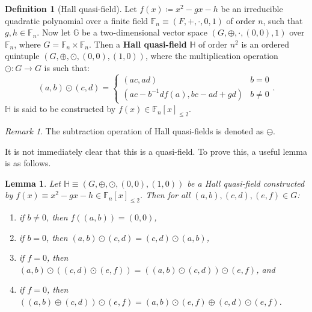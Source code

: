 \documentclass{report}
\newcommand{\F}{\mathbb{F}}
\renewcommand{\H}{\mathbb{H}}
\newcommand{\G}{\mathbb{G}}
\newtheorem{lemma}[theorem]{Lemma}
\theoremstyle{definition}\newtheorem*{definition}{Definition}
\theoremstyle{definition}\newtheorem*{example}{Example}
\theoremstyle{remark}\newtheorem*{remark}{Remark}
\begin{document}
\begin{definition}[Hall quasi-field]
Let $ f(x) \coloneqq x^2 - gx - h $ be an irreducible quadratic polynomial over a finite field $ \F_n \equiv (F, +, \cdot, 0, 1) $ of order $ n $, such that $ g, h \in \F_n $. Now let $ \G $ be a two-dimensional vector space $ (G, \oplus, \cdot, (0, 0), 1) $ over $ \F_n $, where $ G = \F_n \times \F_n $. Then a \textbf{Hall quasi-field} $ \H $ of order $ n^2 $ is an ordered quintuple $ (G, \oplus, \odot, (0, 0), (1, 0)) $, where the multiplication operation $ \odot : G \to G $ is such that: $$ (a, b) \odot (c, d) = \begin{cases} (ac, ad) & b = 0 \\ (ac - b^{-1} d f(a), bc - ad + gd) & b \ne 0 \end{cases}. $$ $ \H $ is said to be constructed by $ f(x) \in \F_n[x]_{\le 2} $.
\end{definition}

\begin{remark}
The subtraction operation of Hall quasi-fields is denoted as $ \ominus $.
\end{remark}

It is not immediately clear that this is a quasi-field. To prove this, a useful lemma is as follows.

\begin{lemma}
\label{lemma:hallquasi}
Let $ \H \equiv (G, \oplus, \odot, (0, 0), (1, 0)) $ be a Hall quasi-field constructed by $ f(x) \equiv x^2 - gx - h \in \F_n[x]_{\le 2} $. Then for all $ (a, b), (c, d), (e, f) \in G $:
\begin{enumerate}
  \item if $ b \ne 0 $, then $ f((a, b)) = (0, 0) $,
  \item if $ b = 0 $, then $ (a, b) \odot (c, d) = (c, d) \odot (a, b) $,
  \item if $ f = 0 $, then $ (a, b) \odot ((c, d) \odot (e, f)) = ((a, b) \odot (c, d)) \odot (e, f) $, and
  \item if $ f = 0 $, then $ ((a, b) \oplus (c, d)) \odot (e, f) = (a, b) \odot (e, f) \oplus (c, d) \odot (e, f) $.
\end{enumerate}
\end{lemma}
\end{document}
